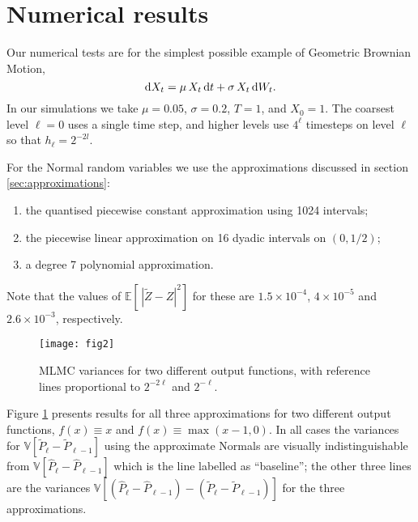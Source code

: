 \documentclass[review]{siamart190516}
\def \EE {{\mathbb{E}}}
\def \VV {{\mathbb{V}}}
\def \D {{\rm d}}
\def \tP {{\widetilde{P}}}
\def \tZ {{\widetilde{Z}}}
\def \hP {{\widehat{P}}}
\begin{document}
\section{Numerical results}

Our numerical tests are for the simplest possible example
of Geometric Brownian Motion,
\begin{equation*}
\label{eqt:gbm_sde}
\D X_t = \mu\, X_t\, \D t + \sigma\, X_t\, \D W_t.
\end{equation*}
In our simulations we take $\mu\!=\!0.05$, $\sigma\!=\!0.2$,
$T\!=\!1$, and $X_0\!=\!1$. The coarsest level $\ell\!=\!0$
uses a single time step, and higher levels use $4^\ell$
timesteps on level $\ell$ so that $h_\ell \!=\! 2^{-2l} $.

For the Normal random variables we use the 
approximations discussed in section \ref{sec:approximations}:
\begin{enumerate}\setlength{\itemsep}{-0.02in}
\item the quantised piecewise constant approximation using 1024 intervals;
\item the piecewise linear approximation on 16 dyadic intervals
on $(0,1/2)$;
\item a degree 7 polynomial approximation.
\end{enumerate}
Note that the values of $\EE[\, | \tZ{-}Z|^2 ]$ for these are
$1.5\!\times\!10^{-4}$, $4\!\times\!10^{-5}$ and $2.6\!\times\!10^{-3}$, respectively.

\begin{figure}[tb]
\centering
\texttt{[image: fig2]}
\caption{MLMC variances for two different output functions, with
  reference lines proportional to $2^{-2\ell}$ and $2^{-\ell}$.}
\label{fig:numeric_results}
\end{figure}

Figure \ref{fig:numeric_results} presents results for all
three approximations for two different output functions,
$f(x) {\equiv} x$ and $f(x) {\equiv} \max(x{-}1,0)$.
In all cases the variances for $\VV[\tP_\ell{-}\tP_{\ell-1}]$
using the approximate Normals are visually indistinguishable
from $\VV[\hP_\ell{-}\hP_{\ell-1}]$ which is the line labelled
as ``baseline''; the other three lines are the variances
$\VV[(\hP_\ell{-}\hP_{\ell-1}) - (\tP_\ell{-}\tP_{\ell-1})]$
for the three approximations.
\end{document}
